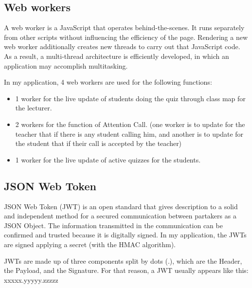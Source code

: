 \documentclass[a4paper, 11pt,openany]{book} %
\begin{document}
\subsection{Web workers}
A web worker is a JavaScript that operates behind-the-scenes. It runs separately from other scripts without influencing the efficiency of the page. Rendering a new web worker additionally creates new threads to carry out that JavaScript code. As a result, a multi-thread architecture is efficiently developed, in which an application may accomplish multitasking. \par
In my application, 4 web workers are used for the following functions:
\begin{itemize}
    \item 1 worker for the live update of students doing the quiz through class map for the lecturer.
    \item 2 workers for the function of Attention Call. (one worker is to update for the teacher that if there is any student calling him, and another is to update for the student that if their call is accepted by the teacher)
    \item 1 worker for the live update of active quizzes for the students.
\end{itemize}
\subsection{JSON Web Token}
JSON Web Token (JWT) is an open standard that gives description to a solid and independent method for a secured communication between partakers as a JSON Object. The information transmitted in the communication can be confirmed and trusted because it is digitally signed. In my application, the JWTs are signed applying a secret (with the HMAC algorithm). \par

JWTs are made up of three components split by dots (.), which are the Header, the Payload, and the Signature. For that reason, a JWT usually appears like this: xxxxx.yyyyy.zzzzz\par
\end{document}
